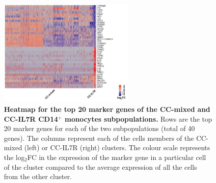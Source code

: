 \begin{figure}[htbp]
\centering
\includegraphics[width=0.6\textwidth]{./Appendix/pdfs/Chapter5/PSA_10X_heatmap_SF_PB_monocytes_clusters_mixed_and_IL7R}
\caption[Heatmap for the top 20 marker genes of the CC-mixed and CC-IL7R CD14$^+$ monocytes subpopulations.]{\textbf{Heatmap for the top 20 marker genes of the CC-mixed and CC-IL7R CD14$^+$ monocytes subpopulations.} Rows are the top 20 marker genes for each of the two subpopulations (total of 40 genes). The columns represent each of the cells members of the CC-mixed (left) or CC-IL7R (right) clusters. The colour scale represents the log$_2$FC in the expression of the marker gene in a particular cell of the cluster compared to the average expression of all the cells from the other cluster.}
\label{fig:PSA_scRNAseq_CC_mixed_and_IL7R_markers_heatmap}
\end{figure}

